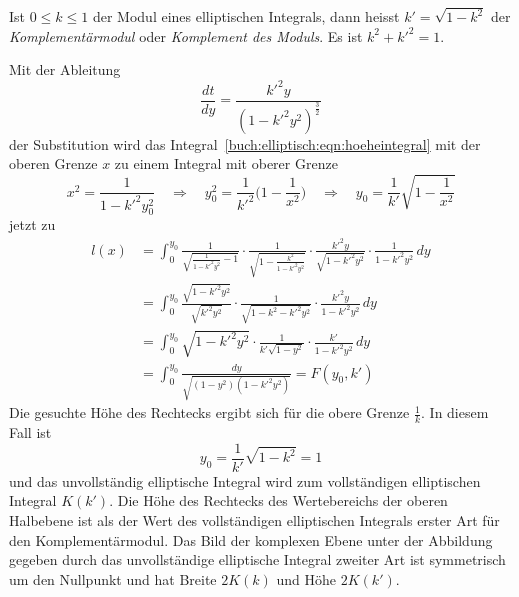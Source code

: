 \begin{definition}
Ist $0\le k\le 1$ der Modul eines elliptischen Integrals, dann heisst
$k' = \sqrt{1-k^2}$ der {\em Komplementärmodul} oder {\em Komplement
des Moduls}. Es ist $k^2+k'^2=1$.
\end{definition}

Mit der Ableitung
\[
\frac{dt}{dy}
=
\frac{k'^2 y}{(1-k'^2y^2)^{\frac32}}
\]
der Substitution
wird das Integral~\eqref{buch:elliptisch:eqn:hoeheintegral} mit der
oberen Grenze $x$ zu einem Integral mit oberer Grenze
\[
x^2 = \frac{1}{1-k'^2y_0^2}
\quad\Rightarrow\quad
y_0^2 = \frac{1}{k'^2}\biggl(1-\frac{1}{x^2}\biggr)
\quad\Rightarrow\quad
y_0=\frac{1}{k'}\sqrt{1-\frac{1}{x^2}}
\]
jetzt zu
\begin{align*}
l(x)
&=
\int_0^{y_0}
\frac{1}{\sqrt{\frac{1}{1-k'^2y^2}-1}}
\cdot
\frac{1}{\sqrt{1-\frac{k^2}{1-k'^2y^2}}}
\cdot
\frac{k'^2y}{\sqrt{1-k'^2y^2}}
\cdot
\frac{1}{1-k'^2y^2}
\,dy
\\
&=
\int_0^{y_0}
\frac{\sqrt{1-k'^2y^2}}{\sqrt{k'^2y^2}}
\cdot
\frac{1}{\sqrt{1-k^2 -k'^2y^2}}
\cdot
\frac{k'^2y}{1-k'^2y^2}
\,dy
\\
&=
\int_0^{y_0}
\sqrt{1-k'^2y^2}
\cdot
\frac{1}{k'\sqrt{1-y^2}}
\cdot
\frac{k'}{1-k'^2y^2}
\,dy
\\
&=
\int_0^{y_0} \frac{dy}{\sqrt{(1-y^2)(1-k'^2y^2)}}
=
F(y_0,k')
\end{align*}
Die gesuchte Höhe des Rechtecks ergibt sich für die obere Grenze $\frac1k$.
In diesem Fall ist
\[
y_0
=
\frac{1}{k'}\sqrt{1-k^2} = 1
\]
und das unvollständig elliptische Integral wird zum vollständigen
elliptischen Integral $K(k')$.
Die Höhe des Rechtecks des Wertebereichs der oberen Halbebene ist
als der Wert des vollständigen elliptischen Integrals erster Art
für den Komplementärmodul.
Das Bild der komplexen Ebene unter der Abbildung gegeben durch das
unvollständige elliptische Integral zweiter Art ist symmetrisch um
den Nullpunkt und hat Breite $2K(k)$ und Höhe $2K(k')$.

